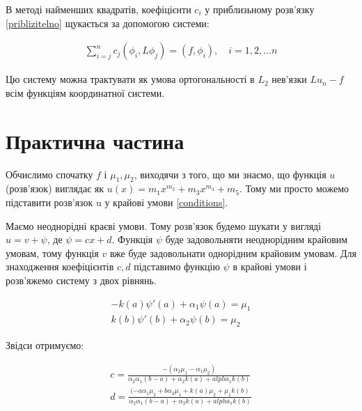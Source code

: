 В методі найменших квадратів, коефіцієнти $c_i$ у приблизьному розв'язку \ref{priblizitelno} щукається за допомогою системи:

\begin{equation} 
\begin{split}
\sum_{i=j}^{n} c_j (\phi_i, L\phi_j) = (f, \phi_i), \quad i = 1, 2, \dots n
\end{split}					
\end{equation}

Цю систему можна трактувати як умова ортогональності в $L_2$ нев'язки $Lu_n - f$ всім функціям координатної системи.


\section{Практична частина}

Обчислимо спочатку $f$ і $\mu_1, \mu_2$, виходячи з того, що ми знаємо, що функція $u$ (розв'язок) виглядає як $u(x) = m_1 x^{m_2} + m_3 x^{m_4} + m_5$. Тому ми просто можемо підставити розв'язок u у крайові умови \ref{conditions}.

\bigskip

Маємо неоднорідні краєві умови. Тому розв'язок будемо шукати у вигляді $u = v + \psi$, де $\psi = cx + d$. Функція $\psi$ буде задовольняти неоднорідним крайовим умовам, тому функція $v$ вже буде задовольнати однорідним крайовим умовам. Для знаходження коефіцієнтів $c,d$ підставимо функцію $\psi$ в крайові умови і розв'яжемо систему з двох рівнянь.

	\begin{equation*}
	\begin{split}
	-k(a)\psi'(a) + \alpha_1 \psi(a) = \mu_1 \\ 
	k(b)\psi'(b) + \alpha_2 \psi(b) = \mu_2
	\end{split}
	\end{equation*}

Звідси отримуємо:

	\begin{equation}
	\begin{split}
c = \frac{-(\alpha_2 \mu_1 - \alpha_1 \mu_2)}{\alpha_2\alpha_1(b-a) + \alpha_2 k(a) + alpha_1 k(b)} \\
d = \frac{(-a \alpha_1 \mu_2 + b \alpha_2 \mu_1 + k(a) \mu_2 + \mu_1 k(b)}{\alpha_2\alpha_1(b-a) + \alpha_2 k(a) + alpha_1 k(b)}
	\end{split}
	\end{equation}
	
